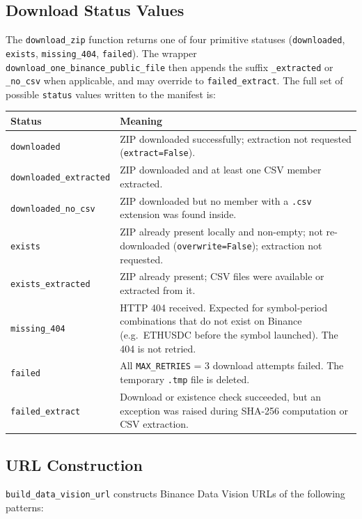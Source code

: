 \documentclass[11pt,a4paper]{article}
\begin{document}
\subsection{Download Status Values}
\label{sec:statuses}

The \texttt{download\_zip} function returns one of four primitive
statuses (\texttt{downloaded}, \texttt{exists}, \texttt{missing\_404},
\texttt{failed}). The wrapper
\texttt{download\_one\_binance\_public\_file} then appends the suffix
\texttt{\_extracted} or \texttt{\_no\_csv} when applicable, and may
override to \texttt{failed\_extract}. The full set of possible
\texttt{status} values written to the manifest is:

\begin{xltabular}{\linewidth}{L{4.8cm}Y}
\toprule
\textbf{Status} & \textbf{Meaning} \\
\midrule
\texttt{downloaded} &
  ZIP downloaded successfully; extraction not requested
  (\texttt{extract=False}). \\
\texttt{downloaded\_extracted} &
  ZIP downloaded and at least one CSV member extracted. \\
\texttt{downloaded\_no\_csv} &
  ZIP downloaded but no member with a \texttt{.csv} extension
  was found inside. \\
\texttt{exists} &
  ZIP already present locally and non-empty; not re-downloaded
  (\texttt{overwrite=False}); extraction not requested. \\
\texttt{exists\_extracted} &
  ZIP already present; CSV files were available or extracted from it. \\
\texttt{missing\_404} &
  HTTP 404 received. Expected for symbol-period combinations that
  do not exist on Binance (e.g.\ ETHUSDC before the symbol launched).
  The 404 is not retried. \\
\texttt{failed} &
  All \texttt{MAX\_RETRIES} = 3 download attempts failed. The
  temporary \texttt{.tmp} file is deleted. \\
\texttt{failed\_extract} &
  Download or existence check succeeded, but an exception was
  raised during SHA-256 computation or CSV extraction. \\
\bottomrule
\end{xltabular}

\subsection{URL Construction}
\label{sec:urls}

\texttt{build\_data\_vision\_url} constructs Binance Data Vision URLs
of the following patterns:
\end{document}
